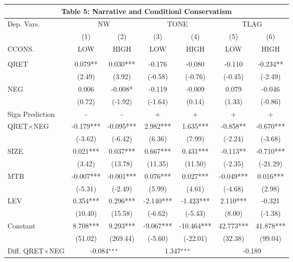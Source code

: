 \begin{table}[htbp] \label{T5}
  \centering
    \begin{tabular}{lcccccc}
    \multicolumn{7}{c}{\textbf{Table 5: Narrative and Conditionl Conservatism}} \\
    \midrule
    \midrule
    Dep. Vars. & \multicolumn{2}{c}{NW} & \multicolumn{2}{c}{TONE} & \multicolumn{2}{c}{TLAG} \\
    \cmidrule{2-7}
      & (1) & (2) & (3) & (4) & (5) & (6) \\
    CCONS. & LOW & HIGH & LOW & HIGH & LOW & HIGH \\
    \midrule
      &   &   &   &   &   &  \\
    QRET & 0.079** & 0.030*** & -0.176 & -0.080 & -0.110 & -0.234** \\
      & (2.49) & (3.92) & (-0.58) & (-0.76) & (-0.45) & (-2.49) \\
    NEG & 0.006 & -0.008* & -0.119 & -0.009 & 0.079 & -0.046 \\
      & (0.72) & (-1.92) & (-1.64) & (0.14) & (1.33) & (-0.86) \\
    \rowcolor[rgb]{ .933,  .925,  .882} Sign Prediction & - & - & + & + & + & + \\
    \rowcolor[rgb]{ .933,  .925,  .882} QRET$\times$NEG & -0.179*** & -0.095*** & 2.982*** & 1.635*** & -0.858** & -0.670*** \\
    \rowcolor[rgb]{ .933,  .925,  .882}   & (-3.62) & (-6.42) & (6.36) & (7.99) & (-2.24) & (-3.68) \\
    SIZE & 0.021*** & 0.037*** & 0.667*** & 0.431*** & -0.113** & -0.710*** \\
      & (3.42) & (13.78) & (11.35) & (11.50) & (-2.35) & (-21.29) \\
    MTB & -0.007*** & -0.001*** & 0.076*** & 0.027*** & -0.049*** & 0.016*** \\
      & (-5.31) & (-2.49) & (5.99) & (4.61) & (-4.68) & (2.98) \\
    LEV & 0.354*** & 0.296*** & -2.140*** & -1.423*** & 2.110*** & -0.321 \\
      & (10.40) & (15.58) & (-6.62) & (-5.43) & (8.00) & (-1.38) \\
    Constant & 8.708*** & 9.293*** & -9.067*** & -10.464*** & 42.773*** & 41.878*** \\
      & (51.02) & (269.44) & (-5.60) & (-22.01) & (32.38) & (99.04) \\
    \rowcolor[rgb]{ .933,  .925,  .882} Diff. QRET$\times$NEG & \multicolumn{2}{c}{ -0.084$^{\star\star\star}$} & \multicolumn{2}{c}{1.347$^{\star\star\star}$} & \multicolumn{2}{c}{-0.189} \\

\end{tabular}
\end{table}
